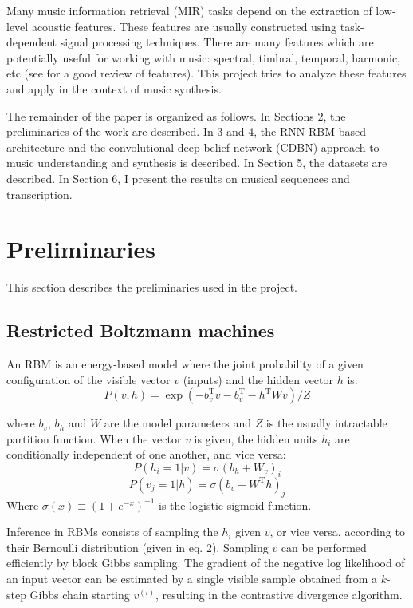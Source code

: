 \documentclass[letterpaper, 10 pt, conference]{ieeeconf}
\begin{document}
Many music information retrieval (MIR) tasks depend on the extraction of low-level acoustic features. These features are usually constructed using task-dependent signal processing techniques. There are many features which are potentially useful for working with music: spectral, timbral, temporal, harmonic, etc (see \cite{c3} for a good review of features). This project tries to analyze these features and apply in the context of music synthesis. 

The remainder of the paper is organized as follows. In Sections 2, the preliminaries of the work are described. In 3 and 4, the RNN-RBM based architecture and the convolutional deep belief network (CDBN) approach to music understanding and synthesis is described. In Section 5, the datasets are described. In Section 6, I present the results on musical sequences and transcription.

\section{Preliminaries}
This section describes the preliminaries used in the project. 
\subsection{Restricted Boltzmann machines}
An RBM is an energy-based model where the joint probability of a given configuration of the visible vector $v$ (inputs) and the hidden vector $h$ is:
\begin{equation}
P(v,h) = \exp(-b_v^\textrm{T} v -b_v^\textrm{T} -h^\textrm{T}Wv )/Z
\end{equation}

where $b_v$, $b_h$ and $W$ are the model parameters and $Z$ is the usually intractable partition function. When the vector $v$ is given, the hidden units $h_i$ are conditionally independent of one another, and vice versa: 
\begin{equation}
P(h_i = 1 | v) = \sigma(b_h + W_v)_i
\end{equation}
\begin{equation}
P(v_j = 1 | h) = \sigma(b_v + W^\textrm{T} h)_j
\end{equation}
Where $\sigma(x) \equiv(1 + e^{-x})^{-1}$ is the logistic sigmoid function.

Inference in RBMs consists of sampling the $h_i$ given $v$, or vice versa, according to their Bernoulli distribution (given in eq. 2). Sampling $v$ can be performed efficiently by block Gibbs sampling. The gradient of the negative log likelihood of an input vector can be estimated by a single visible sample obtained from a $k$-step Gibbs chain starting $v^{(l)}$, resulting in the contrastive divergence algorithm\cite{c9}.%
\end{document}
